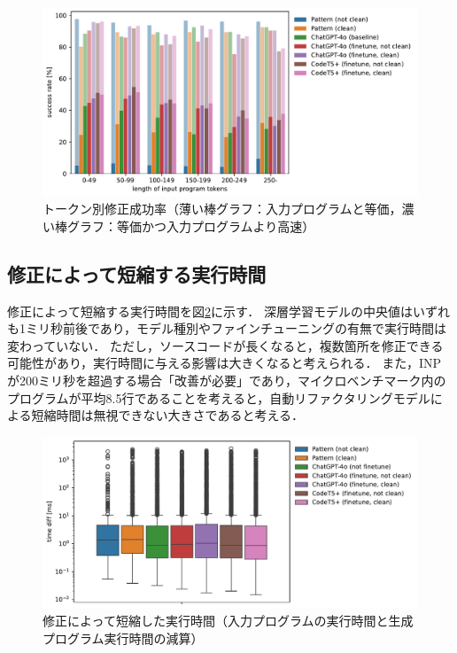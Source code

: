 \documentclass[11pt]{jreport}
\begin{document}
\begin{figure}[t]
\begin{center}
\includegraphics[width=1.0\linewidth]{Omori_fig/figure-token.pdf}
\caption{トークン別修正成功率（薄い棒グラフ：入力プログラムと等価，濃い棒グラフ：等価かつ入力プログラムより高速）}
\label{fig:eval-1:result-token}
\end{center}
\end{figure}




\subsection{修正によって短縮する実行時間}


修正によって短縮する実行時間を図\ref{fig:eval-1:result-fast-time}に示す．
深層学習モデルの中央値はいずれも1ミリ秒前後であり，モデル種別やファインチューニングの有無で実行時間は変わっていない．
ただし，ソースコードが長くなると，複数箇所を修正できる可能性があり，実行時間に与える影響は大きくなると考えられる．
また，INPが200ミリ秒を超過する場合「改善が必要」であり，マイクロベンチマーク内のプログラムが平均8.5行であることを考えると，自動リファクタリングモデルによる短縮時間は無視できない大きさであると考える．


\begin{figure}[t]
\begin{center}
\includegraphics[width=1.0\linewidth]{Omori_fig/figure.pdf}
\caption{修正によって短縮した実行時間（入力プログラムの実行時間と生成プログラム実行時間の減算）}
\label{fig:eval-1:result-fast-time}
\end{center}
\end{figure}
\end{document}

